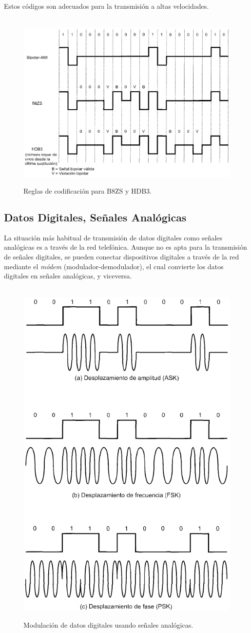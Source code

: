 \documentclass[10pt,a4paper]{article}
\begin{document}
Estos códigos son adecuados para la transmisión a altas velocidades.

\begin{figure}[ht!]
  \caption{Reglas de codificación para B8ZS y HDB3.}
  \label{fig:b8zs_hdb3}  
  \centering
  \hbox{
	\includegraphics[width=\textwidth-\fboxrule-\fboxrule]{imgs/b8zs_hdb3.png}}
\end{figure}

\subsection{Datos Digitales, Señales Analógicas}

La situación más habitual de transmisión de datos digitales como señales analógicas es a través de la red telefónica. Aunque no es apta para la transmisión de señales digitales, se pueden conectar dispositivos digitales a través de la red mediante el \textit{módem} (modulador-demodulador), el cual convierte los datos digitales en señales analógicas, y viceversa.

\begin{figure}
  \caption{Modulación de datos digitales usando señales analógicas.}
  \label{fig:dat_dig_dat_ana}  
  \centering
  \hbox{
	\includegraphics[width=0.5\textwidth-\fboxrule-\fboxrule]{imgs/dat_dig_dat_ana.png}}
\end{figure}
\end{document}
